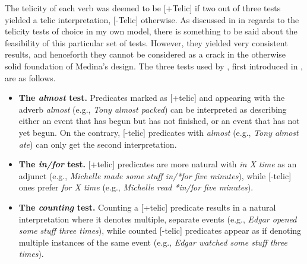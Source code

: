 The telicity of each verb was deemed to be [+Telic] if two out of three tests yielded a telic interpretation, [-Telic] otherwise. As discussed in  in regards to the telicity tests of choice in my own model, there is something to be said about the feasibility of this particular set of tests. However, they yielded very consistent results, and henceforth they cannot be considered as a crack in the otherwise solid foundation of Medina's design. The three tests used by \textcite[302-303]{Medina2007}, first introduced in , are as follows.
\begin{itemize}
    \item \textbf{The \textit{almost} test.} Predicates marked as [+telic] and appearing with the adverb \textit{almost} (e.g., \textit{Tony almost packed}) can be interpreted as describing either an event that has begun but has not finished, or an event that has not yet begun. On the contrary, [-telic] predicates with \textit{almost} (e.g., \textit{Tony almost ate}) can only get the second interpretation.
    \item \textbf{The \textit{in/for} test.} [+telic] predicates are more natural with \textit{in X time} as an adjunct (e.g., \textit{Michelle made some stuff in/*for five minutes}), while [-telic] ones prefer \textit{for X time} (e.g., \textit{Michelle read *in/for five minutes}).
    \item \textbf{The \textit{counting} test.} Counting a [+telic] predicate results in a natural interpretation where it denotes multiple, separate events (e.g., \textit{Edgar opened some stuff three times}), while counted [-telic] predicates appear as if denoting multiple instances of the same event (e.g., \textit{Edgar watched some stuff three times}).
\end{itemize}

